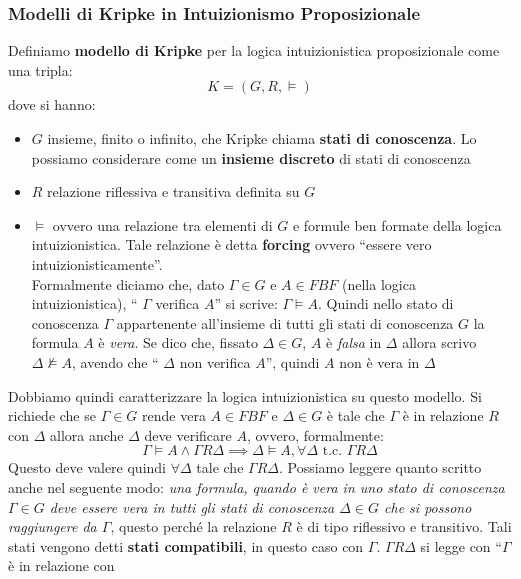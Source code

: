 \documentclass[a4paper,12pt, oneside]{book}
\begin{document}
\subsubsection{Modelli di Kripke in Intuizionismo Proposizionale}
\begin{definizione}
  Definiamo \textbf{modello di Kripke} per la logica intuizionistica
  proposizionale come una tripla:
  \[K=(G, R, \vDash)\]
  dove si hanno:
  \begin{itemize}
    \item $G$ insieme, finito o infinito, che Kripke chiama \textbf{stati di
      conoscenza}. Lo possiamo considerare come un \textbf{insieme discreto} di
    stati di conoscenza 
    \item $R$ relazione riflessiva e transitiva definita su $G$
    \item $\vDash$ ovvero una relazione tra elementi di $G$ e formule ben
    formate della logica intuizionistica. Tale relazione è detta
    \textbf{forcing} ovvero ``essere vero intuizionisticamente''.\\
    Formalmente diciamo che, dato $\Gamma\in G$ e $A\in FBF$ (nella logica
    intuizionistica), ``$\,\,\Gamma$ verifica $A$'' si scrive: $\Gamma\vDash
    A$. Quindi nello stato di conoscenza $\Gamma$ appartenente all'insieme di
    tutti gli stati di 
    conoscenza $G$ la formula $A$ è \emph{vera}. Se dico che, fissato $\Delta\in
    G$, $A$ è \emph{falsa} in $\Delta$ allora scrivo $\Delta\nvDash A$, avendo
    che ``$\,\,\Delta$ non verifica $A$'', quindi $A$ non è vera in $\Delta$
  \end{itemize}
\end{definizione}
Dobbiamo quindi caratterizzare la logica intuizionistica su questo modello. Si
richiede che se $\Gamma\in G$ rende vera $A\in FBF$ e $\Delta\in G$ è tale che
$\Gamma$ è in relazione $R$ con $\Delta$ allora anche $\Delta$ deve verificare
$A$, ovvero, formalmente:
\[\Gamma\vDash A \land \Gamma R\Delta\implies \Delta \vDash A, \forall \Delta
  \mbox{ t.c. } \Gamma R\Delta\]
Questo deve valere quindi $\forall \Delta$ tale che $\Gamma R \Delta$.
Possiamo leggere quanto scritto anche nel seguente modo: \textit{una formula,
  quando è vera in uno stato di conoscenza $\Gamma\in G$ deve essere vera in
  tutti gli stati di conoscenza $\Delta\in G$ che si possono raggiungere da
  $\Gamma$}, questo perché la relazione $R$ è di tipo riflessivo e
transitivo. Tali stati vengono detti \textbf{stati compatibili}, in questo caso
con $\Gamma$. $\Gamma R \Delta$ si legge con ``$\Gamma$ è in relazione con
\end{document}

